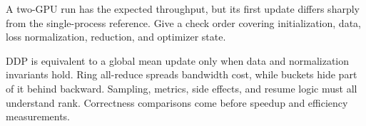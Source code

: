 \documentclass[handout]{beamer}
\begin{document}
  {A two-GPU run has the expected throughput, but its first update differs sharply from the single-process reference. Give a check order covering initialization, data, loss normalization, reduction, and optimizer state.}

\takeaways
  {DDP is equivalent to a global mean update only when data and normalization invariants hold.}
  {Ring all-reduce spreads bandwidth cost, while buckets hide part of it behind backward.}
  {Sampling, metrics, side effects, and resume logic must all understand rank.}
  {Correctness comparisons come before speedup and efficiency measurements.}
\end{document}
